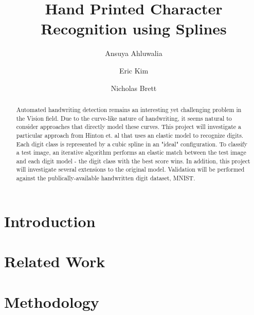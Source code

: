 \documentclass[oribibl]{llncs}
\begin{document}
\title{Hand Printed Character Recognition using Splines}
\author{ Ansuya Ahluwalia \and Eric Kim \and Nicholas Brett }
\maketitle

\begin{abstract}

Automated handwriting detection remains an interesting yet challenging problem in the Vision field. Due to the curve-like nature of handwriting, it seems natural to consider approaches that directly model these curves. This project will investigate a particular approach from Hinton et. al \cite{Hinton92adaptiveelastic} that uses an elastic model to recognize digits. Each digit class is represented by a cubic spline in an "ideal" configuration. To classify a test image, an iterative algorithm performs an elastic match between the test image and each digit model - the digit class with the best score wins. In addition, this project will investigate several extensions to the original model. Validation will be performed against the publically-available handwritten digit dataset, MNIST.

\end{abstract}

\keywords{}

\section{Introduction}


\section{Related Work}
 

\section{Methodology}
\end{document}
